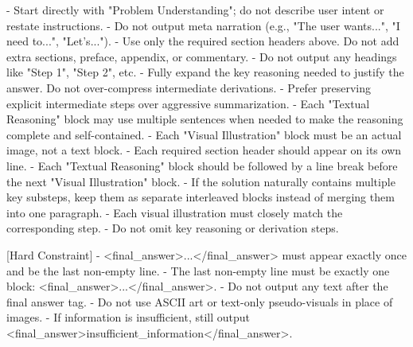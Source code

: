 \documentclass[11pt]{article}
\begin{document}
\begin{tcolorbox}
\begin{tcblisting}
- Start directly with "Problem Understanding"; do not describe user intent or restate instructions.
- Do not output meta narration (e.g., "The user wants...", "I need to...", "Let's...").
- Use only the required section headers above. Do not add extra sections, preface, appendix, or commentary.
- Do not output any headings like "Step 1", "Step 2", etc.
- Fully expand the key reasoning needed to justify the answer. Do not over-compress intermediate derivations.
- Prefer preserving explicit intermediate steps over aggressive summarization.
- Each "Textual Reasoning" block may use multiple sentences when needed to make the reasoning complete and self-contained.
- Each "Visual Illustration" block must be an actual image, not a text block.
- Each required section header should appear on its own line.
- Each "Textual Reasoning" block should be followed by a line break before the next "Visual Illustration" block.
- If the solution naturally contains multiple key substeps, keep them as separate interleaved blocks instead of merging them into one paragraph.
- Each visual illustration must closely match the corresponding step.
- Do not omit key reasoning or derivation steps.

[Hard Constraint]
- <final_answer>...</final_answer> must appear exactly once and be the last non-empty line.
- The last non-empty line must be exactly one block: <final_answer>...</final_answer>.
- Do not output any text after the final answer tag.
- Do not use ASCII art or text-only pseudo-visuals in place of images.
- If information is insufficient, still output <final_answer>insufficient_information</final_answer>.
\end{tcblisting}
\end{tcolorbox}
\end{document}
